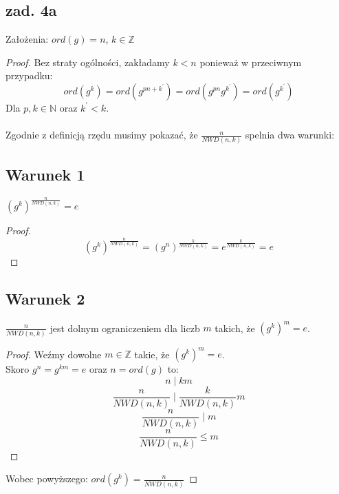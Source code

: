 \documentclass{article}
\title{}
\date{27.10.2020}
\begin{document}
\subsection*{zad. 4a}
Założenia: $ord(g) = n$, $k\in \mathbb{Z}$
\begin{proof}
Bez straty ogólności, zakładamy $k < n$ ponieważ w przeciwnym\\ przypadku:
$$
ord(g^k) = ord(g^{pn + k^\prime}) = ord(g^{pn}g^{k^\prime}) = ord(g^{k^\prime})
$$
Dla $p,k \in \mathbb{N}$ oraz $k^\prime < k$.\\\\
Zgodnie z definicją rzędu musimy pokazać, że $\frac{n}{NWD(n,k)}$ spelnia dwa warunki:\\
\subsection*{Warunek 1}
$(g^k)^{\frac{n}{NWD(n,k)}} = e$
\begin{proof}
$$
(g^k)^{\frac{n}{NWD(n,k)}} = (g^n)^{\frac{k}{NWD(n,k)}} = e^{\frac{k}{NWD(n,k)}} = e
$$
\end{proof}
\subsection*{Warunek 2}
$\frac{n}{NWD(n,k)}$ jest dolnym ograniczeniem dla liczb $m$ takich, że $(g^k)^m = e$.
\begin{proof}
Weźmy dowolne $m \in \mathbb{Z}$ takie, że $(g^k)^m = e$.\\
Skoro $g^n = g^{km} = e$ oraz $n = ord(g)$ to:
$$n \mid km$$
$$
\frac{n}{NWD(n,k)} \mid \frac{k}{NWD(n,k)}m
$$
$$
\frac{n}{NWD(n,k)} \mid m
$$
$$
\frac{n}{NWD(n,k)} \leq m
$$
\end{proof}
Wobec powyższego: $ord(g^k) = \frac{n}{NWD(n,k)}$
\end{proof}
\end{document}

